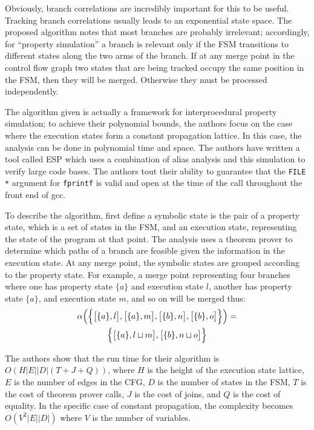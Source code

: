 \documentclass{article}
\begin{document}
\begin{multicols}{2}
Obviously, branch correlations are incredibly important for this to be
useful.  Tracking branch correlations usually leads to an exponential
state space.  The proposed algorithm notes that most branches are
probably irrelevant; accordingly, for ``property simulation'' a branch
is relevant only if the FSM transitions to different states along the
two arms of the branch.  If at any merge point in the control flow
graph two states that are being tracked occupy the same position in
the FSM, then they will be merged.  Otherwise they must be processed
independently.

The algorithm given is actually a framework for interprocedural
property simulation; to achieve their polynomial bounds, the authors
focus on the case where the execution states form a constant
propagation lattice.  In this case, the analysis can be done in
polynomial time and space.  The authors have written a tool called ESP
which uses a combination of alias analysis and this simulation to
verify large code bases.  The authors tout their ability to guarantee
that the \texttt{FILE *} argument for \texttt{fprintf} is valid and
open at the time of the call throughout the front end of gcc.

To describe the algorithm, first define a symbolic state is the pair
of a property state, which is a set of states in the FSM, and an
execution state, representing the state of the program at that point.
The analysis uses a theorem prover to determine which paths of a
branch are feasible given the information in the execution state.  At
any merge point, the symbolic states are grouped according to the
property state.  For example, a merge point representing four branches
where one has property state $\{a\}$ and execution state $l$, another
has property state $\{a\}$, and execution state $m$, and so on will be
merged thus:
\begin{multline*}
\alpha \Bigl(\Bigl\{\bigl[\{a\}, l\bigr], \bigl[\{a\}, m\bigr],
 \bigl[\{b\}, n\bigr], \bigl[\{b\}, o\bigr]\Bigr\}\Bigr) = \\
\Bigl\{\bigl[\{a\}, l \sqcup m\bigr], \bigl[\{b\}, n \sqcup o\bigr]\Bigr\}
\end{multline*}

The authors show that the run time for their algorithm is $O(H | E | |
D | (T + J + Q))$, where $H$ is the height of the execution state
lattice, $E$ is the number of edges in the CFG, $D$ is the number of
states in the FSM, $T$ is the cost of theorem prover calls, $J$ is the
cost of joins, and $Q$ is the cost of equality.  In the specific case
of constant propagation, the complexity becomes $O(V^2|E||D|)$ where
$V$ is the number of variables.


\end{multicols}
\end{document}
